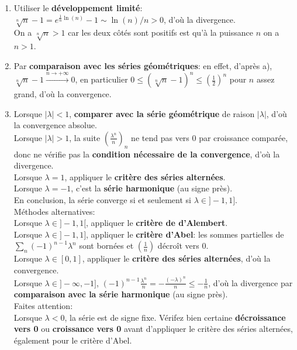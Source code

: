 \documentclass[a4paper,10pt]{article}
\newcommand{\abs}[1]{\left|#1\right|}
\newcommand{\correction}[1]{{\color{red}#1}}
\newcommand{\comment}[1]{{\color{blue}#1}}
\begin{document}
\correction{
\begin{enumerate}[label=\alph*)]
    \item Utiliser le \textbf{développement limité}: $\sqrt[n]{n}-1=e^{\frac{1}{n}\ln(n)}-1\sim\ln(n)/n>0$, d'où la divergence.\\
    \comment{On a $\sqrt[n]{n}>1$ car les deux côtés sont positifs est qu'à la puissance $n$ on a $n>1$.}
    \item Par \textbf{comparaison avec les séries géométriques}: en effet, d'après a), $\sqrt[n]{n}-1\xrightarrow{n\to+\infty}0$, en particulier $0\leq(\sqrt[n]{n}-1)^n\leq(\frac{1}{2})^n$ pour $n$ assez grand, d'où la convergence.
    \item
    Lorsque $\abs{\lambda}<1$, \textbf{comparer avec la série géométrique} de raison $\abs{\lambda}$, d'où la convergence absolue.\\
    Lorsque $\abs{\lambda}>1$, la suite $(\frac{\lambda^n}{n})_n$ ne tend pas vers 0 par croissance comparée, donc ne vérifie pas la \textbf{condition nécessaire de la convergence}, d'où la divergence.\\
    Lorsque $\lambda=1$, appliquer le \textbf{critère des séries alternées}.\\
    Lorsque $\lambda=-1$, c'est la \textbf{série harmonique} (au signe près).\\
    En conclusion, la série converge si et seulement si $\lambda\in]-1,1]$.\\
    \comment{Méthodes alternatives:\\
    Lorsque $\lambda\in]-1,1[$, appliquer le \textbf{critère de d'Alembert}.\\
    Lorsque $\lambda\in]-1,1]$, appliquer le \textbf{critère d'Abel}: les sommes partielles de $\sum_{n}(-1)^{n-1}\lambda^n$ sont bornées et $(\frac{1}{n})$ décroît vers 0.\\
    Lorsque $\lambda\in[0,1]$, appliquer le \textbf{critère des séries alternées}, d'où la convergence.\\
    Lorsque $\lambda\in]-\infty,-1]$, $(-1)^{n-1}\frac{\lambda^n}{n}=-\frac{(-\lambda)^n}{n}\leq-\frac{1}{n}$, d'où la divergence par \textbf{comparaison avec la série harmonique} (au signe près).\\
    Faites attention:\\
    Lorsque $\lambda<0$, la série est de signe fixe.
    Vérifez bien certaine \textbf{décroissance vers 0} ou \textbf{croissance vers 0} avant d'appliquer le critère des séries alternées, également pour le critère d'Abel.\\
}
\end{enumerate}}
\end{document}
